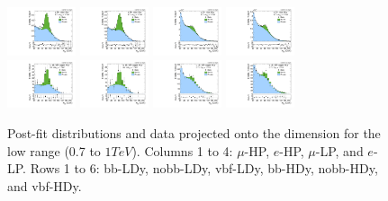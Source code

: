 \begin{figure}[htbp]
  \includegraphics[width=0.18\textwidth]{fig/fitValidation/PostFit_SR_MJJ_MVV0700to1000__mu_HP_nobb_HDy_Run2.pdf}
  \includegraphics[width=0.18\textwidth]{fig/fitValidation/PostFit_SR_MJJ_MVV0700to1000__e_HP_nobb_HDy_Run2.pdf}
  \includegraphics[width=0.18\textwidth]{fig/fitValidation/PostFit_SR_MJJ_MVV0700to1000__mu_LP_nobb_HDy_Run2.pdf}
  \includegraphics[width=0.18\textwidth]{fig/fitValidation/PostFit_SR_MJJ_MVV0700to1000__e_LP_nobb_HDy_Run2.pdf}\\
  \includegraphics[width=0.18\textwidth]{fig/fitValidation/PostFit_SR_MJJ_MVV0700to1000__mu_HP_vbf_HDy_Run2.pdf}
  \includegraphics[width=0.18\textwidth]{fig/fitValidation/PostFit_SR_MJJ_MVV0700to1000__e_HP_vbf_HDy_Run2.pdf}
  \includegraphics[width=0.18\textwidth]{fig/fitValidation/PostFit_SR_MJJ_MVV0700to1000__mu_LP_vbf_HDy_Run2.pdf}
  \includegraphics[width=0.18\textwidth]{fig/fitValidation/PostFit_SR_MJJ_MVV0700to1000__e_LP_vbf_HDy_Run2.pdf}\\
  \caption{
    Post-fit distributions and data projected onto the \MJ dimension for the low \MVV range (0.7 to $1\unit{TeV}$).
    Columns 1 to 4: $\mu$-HP, $e$-HP, $\mu$-LP, and $e$-LP.
    Rows 1 to 6: bb-LDy, nobb-LDy, vbf-LDy, bb-HDy, nobb-HDy, and vbf-HDy.
  }
  \label{fig:postfit_MJJ_MVV0700to1000_Run2}
\end{figure}

